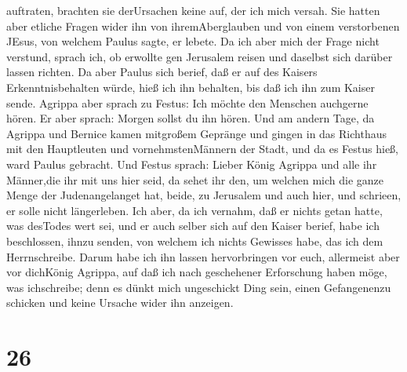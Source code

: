 auftraten, brachten sie derUrsachen keine auf, der ich mich versah.
 Sie hatten aber etliche Fragen wider ihn von
ihremAberglauben und von einem verstorbenen JEsus, von welchem Paulus
sagte, er lebete.  Da ich aber mich der Frage nicht
verstund, sprach ich, ob erwollte gen Jerusalem reisen und daselbst sich
darüber lassen richten.  Da aber Paulus sich berief, daß er
auf des Kaisers Erkenntnisbehalten würde, hieß ich ihn behalten, bis daß
ich ihn zum Kaiser sende.  Agrippa aber sprach zu Festus:
Ich möchte den Menschen auchgerne hören. Er aber sprach: Morgen sollst
du ihn hören.  Und am andern Tage, da Agrippa und Bernice
kamen mitgroßem Gepränge und gingen in das Richthaus mit den Hauptleuten
und vornehmstenMännern der Stadt, und da es Festus hieß, ward Paulus
gebracht.  Und Festus sprach: Lieber König Agrippa und alle
ihr Männer,die ihr mit uns hier seid, da sehet ihr den, um welchen mich
die ganze Menge der Judenangelanget hat, beide, zu Jerusalem und auch
hier, und schrieen, er solle nicht längerleben.  Ich aber,
da ich vernahm, daß er nichts getan hatte, was desTodes wert sei, und er
auch selber sich auf den Kaiser berief, habe ich beschlossen, ihnzu
senden,  von welchem ich nichts Gewisses habe, das ich dem
Herrnschreibe. Darum habe ich ihn lassen hervorbringen vor euch,
allermeist aber vor dichKönig Agrippa, auf daß ich nach geschehener
Erforschung haben möge, was ichschreibe;  denn es dünkt
mich ungeschickt Ding sein, einen Gefangenenzu schicken und keine
Ursache wider ihn anzeigen.

\hypertarget{section-25}{%
\section{26}\label{section-25}}

